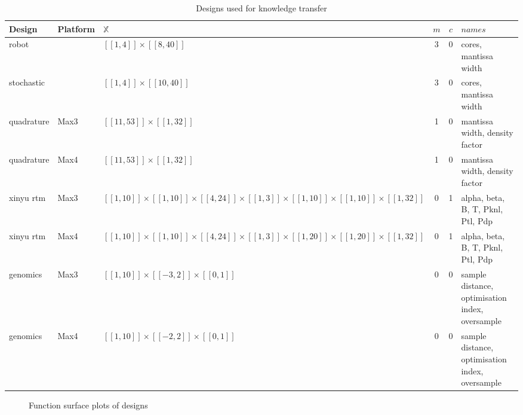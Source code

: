 \documentclass[10pt,a4paper]{article}
\newcommand{\dsb}[1]{[\![#1]\!]}
\begin{document}
\begin{table}[H]
	\begin{tabularx}{\linewidth}{X l Y c c X}
		\hline
		Design & Platform & $\mathbb{X}$ & $m$ & $c$ & $names$\\
		\hline
		robot & & $\dsb{1,4}\times\dsb{8,40}$ & 3 & 0 & cores, mantissa width\\
		stochastic & & $\dsb{1,4}\times\dsb{10,40}$ & 3 & 0 & cores, mantissa width\\
		quadrature\cite{Tse2012} & Max3 & $\dsb{11,53}\times\dsb{1,32}$ & 1 & 0 & mantissa width, density factor\\
		quadrature\cite{Tse2012} & Max4 & $\dsb{11,53}\times\dsb{1,32}$ & 1 & 0 & mantissa width, density factor\\
		xinyu rtm & Max3 & $\dsb{1,10}\times\dsb{1,10}\times\dsb{4,24}\times\dsb{1,3}\times\dsb{1,10}\times\dsb{1,10}\times\dsb{1,32}$ & 0 & 1 & alpha, beta, B, T, Pknl, Ptl, Pdp\\
		xinyu rtm & Max4 & $\dsb{1,10}\times\dsb{1,10}\times\dsb{4,24}\times\dsb{1,3}\times\dsb{1,20}\times\dsb{1,20}\times\dsb{1,32}$ & 0 & 1 & alpha, beta, B, T, Pknl, Ptl, Pdp\\
		genomics\cite{Arram2017} & Max3 & $\dsb{1,10}\times\dsb{-3,2}\times\dsb{0,1}$ & 0 & 0 & sample distance, optimisation index, oversample\\
		genomics\cite{Arram2017} & Max4 & $\dsb{1,10}\times\dsb{-2,2}\times\dsb{0,1}$ & 0 & 0 & sample distance, optimisation index, oversample\\
		\hline
 	\end{tabularx}
	\caption{Designs used for knowledge transfer}
\end{table}

\begin{figure}[H]
	 \begin{center}
	\end{center}
	\caption{Function surface plots of designs}
	\label{fig:subfigures}
\end{figure}
\end{document}
